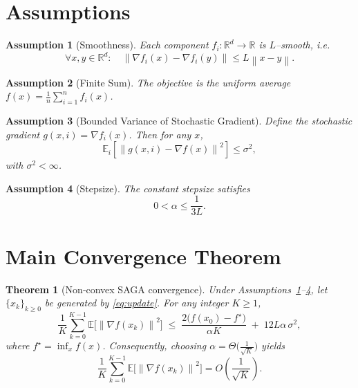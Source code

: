 \documentclass{article}
\newtheorem{theorem}{Theorem}
\newtheorem{assumption}{Assumption}
\newcommand{\E}{\mathbb{E}}
\newcommand{\R}{\mathbb{R}}
\newcommand{\norm}[1]{\left\|#1\right\|}
\newcommand{\grad}{\nabla}
\begin{document}
\section*{Assumptions}
\begin{assumption}[Smoothness]\label{ass:smooth}
Each component $f_i:\R^{d}\to\R$ is $L$–smooth, i.e.
\[
\forall x,y\in\R^{d}:\quad 
\norm{\grad f_i(x)-\grad f_i(y)}\le L\norm{x-y}.
\]
\end{assumption}
\begin{assumption}[Finite Sum]\label{ass:finite}
The objective is the uniform average $f(x)=\frac1n\sum_{i=1}^{n}f_i(x)$.
\end{assumption}
\begin{assumption}[Bounded Variance of Stochastic Gradient]\label{ass:var}
Define the stochastic gradient $g(x,i)=\grad f_i(x)$. Then for any $x$,
\[
\E_{i}\!\left[\norm{g(x,i)-\grad f(x)}^{2}\right]\le \sigma^{2},
\]
with $\sigma^{2}<\infty$.
\end{assumption}
\begin{assumption}[Stepsize]\label{ass:stepsize}
The constant stepsize satisfies
\[
0<\alpha\le \frac{1}{3L}.
\]
\end{assumption}

\section*{Main Convergence Theorem}
\begin{theorem}[Non‑convex SAGA convergence]\label{thm:main}
Under Assumptions~\ref{ass:smooth}–\ref{ass:stepsize}, let $\{x_k\}_{k\ge0}$ be generated by \eqref{eq:update}. For any integer $K\ge1$,
\[
\frac{1}{K}\sum_{k=0}^{K-1}\E\!\bigl[\norm{\grad f(x_k)}^{2}\bigr]
\;\le\;
\frac{2\bigl(f(x_{0})-f^{\star}\bigr)}{\alpha K}
\;+\;
12L\alpha\,\sigma^{2},
\]
where $f^{\star}= \inf_{x}f(x)$.
Consequently, choosing $\alpha = \Theta\bigl(\tfrac{1}{\sqrt{K}}\bigr)$ yields
\[
\frac{1}{K}\sum_{k=0}^{K-1}\E\!\bigl[\norm{\grad f(x_k)}^{2}\bigr]
= O\!\left(\frac{1}{\sqrt{K}}\right).
\]
\end{theorem}
\end{document}
